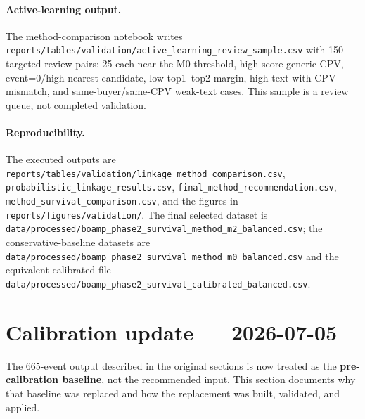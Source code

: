 \documentclass[12pt, a4paper]{article}
\begin{document}
\paragraph{Active-learning output.}
The method-comparison notebook writes
\texttt{reports/tables/validation/active\_learning\_review\_sample.csv} with
150 targeted review pairs: 25 each near the M0 threshold, high-score generic
CPV, event=0/high nearest candidate, low top1--top2 margin, high text with CPV
mismatch, and same-buyer/same-CPV weak-text cases. This sample is a review
queue, not completed validation.

\paragraph{Reproducibility.}
The executed outputs are
\texttt{reports/tables/validation/linkage\_method\_comparison.csv},
\texttt{probabilistic\_linkage\_results.csv},
\texttt{final\_method\_recommendation.csv},
\texttt{method\_survival\_comparison.csv}, and the figures in
\texttt{reports/figures/validation/}. The final selected dataset is
\texttt{data/processed/boamp\_phase2\_survival\_method\_m2\_balanced.csv};
the conservative-baseline datasets are
\texttt{data/processed/boamp\_phase2\_survival\_method\_m0\_balanced.csv} and
the equivalent calibrated file
\texttt{data/processed/boamp\_phase2\_survival\_calibrated\_balanced.csv}.

\section*{Calibration update --- 2026-07-05}
\label{sec:calibration-update}

The 665-event output described in the original sections is now treated as the
\textbf{pre-calibration baseline}, not the recommended input. This section
documents why that baseline was replaced and how the replacement was built,
validated, and applied.
\end{document}
